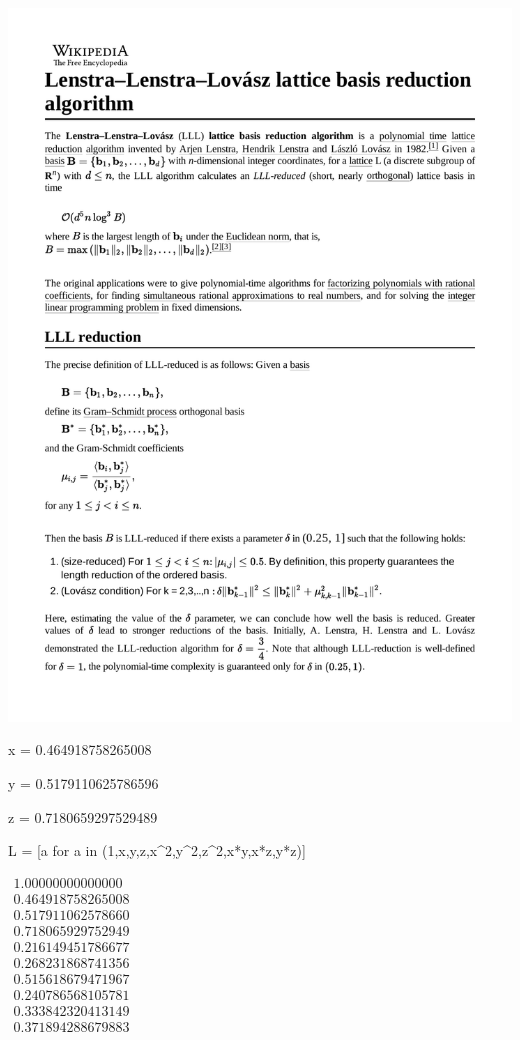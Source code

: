 \documentclass{beamer}
\begin{document}
\begin{frame}
\includegraphics[page=3,clip,trim=0in 7.5in 0in 1in, width=\textwidth]{Lenstra–Lenstra–Lovasz_lattice_basis_reduction_algorithm.pdf}
\end{frame}

\begin{frame}
\begin{semiverbatim}
\small
x = 0.464918758265008

y = 0.5179110625786596

z = 0.7180659297529489



L = [a for a in (1,x,y,z,x\^{}2,y\^{}2,z\^{}2,x*y,x*z,y*z)]


$\begin{array}{r}
1.00000000000000 \\
0.464918758265008 \\
0.517911062578660 \\
0.718065929752949 \\
0.216149451786677 \\
0.268231868741356 \\
0.515618679471967 \\
0.240786568105781 \\
0.333842320413149 \\
0.371894288679883
\end{array}
$

\end{semiverbatim}
\end{frame}
\end{document}
